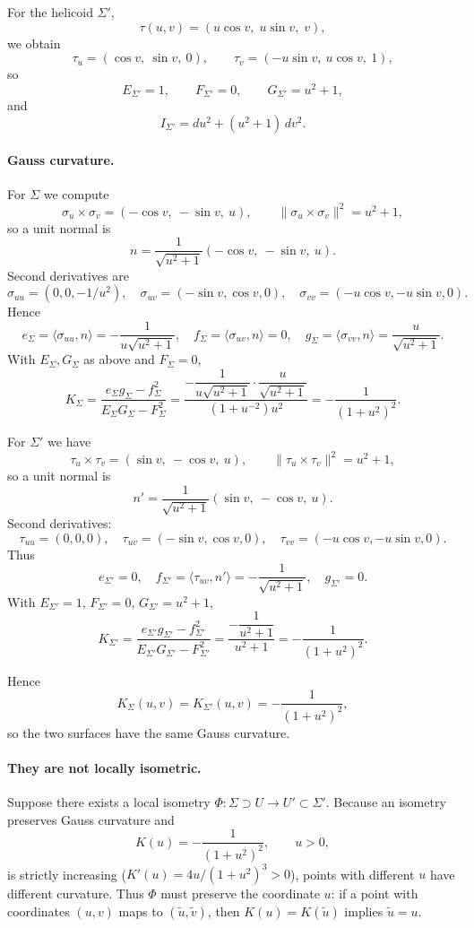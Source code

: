 \documentclass[12pt,a4paper]{article}
\theoremstyle{plain}
\theoremstyle{definition}      %
\begin{document}
	For the helicoid $\Sigma'$,
	\[
	\tau(u,v) = (u\cos v,\;u\sin v,\;v),
	\]
	we obtain
	\[
	\tau_u=(\cos v,\ \sin v,\ 0),\qquad
	\tau_v=(-u\sin v,\ u\cos v,\ 1),
	\]
	so
	\[
	E_{\Sigma'} = 1,\qquad
	F_{\Sigma'} = 0,\qquad
	G_{\Sigma'} = u^2+1,
	\]
	and
	\[
	I_{\Sigma'} = du^2 + (u^2+1)\,dv^2.
	\]
	
	\paragraph{Gauss curvature.}
	
	For $\Sigma$ we compute
	\[
	\sigma_u\times\sigma_v = (-\cos v,\ -\sin v,\ u),
	\qquad
	\| \sigma_u\times\sigma_v \|^2 = u^2+1,
	\]
	so a unit normal is
	\[
	n = \frac{1}{\sqrt{u^2+1}}(-\cos v,\ -\sin v,\ u).
	\]
	Second derivatives are
	\[
	\sigma_{uu}=(0,0,-1/u^2),\quad
	\sigma_{uv}=(-\sin v,\cos v,0),\quad
	\sigma_{vv}=(-u\cos v,-u\sin v,0).
	\]
	Hence
	\[
	e_\Sigma = \langle\sigma_{uu},n\rangle
	= -\frac{1}{u\sqrt{u^2+1}},\quad
	f_\Sigma = \langle\sigma_{uv},n\rangle = 0,\quad
	g_\Sigma = \langle\sigma_{vv},n\rangle
	= \frac{u}{\sqrt{u^2+1}}.
	\]
	With $E_\Sigma,G_\Sigma$ as above and $F_\Sigma=0$,
	\[
	K_\Sigma
	= \frac{e_\Sigma g_\Sigma - f_\Sigma^{2}}{E_\Sigma G_\Sigma-F_\Sigma^{2}}
	= \frac{-\dfrac{1}{u\sqrt{u^2+1}}\cdot
		\dfrac{u}{\sqrt{u^2+1}}}{(1+u^{-2})u^2}
	= -\frac{1}{(1+u^2)^2}.
	\]
	
	For $\Sigma'$ we have
	\[
	\tau_u\times\tau_v = (\sin v,\ -\cos v,\ u),\qquad
	\|\tau_u\times\tau_v\|^2 = u^2+1,
	\]
	so a unit normal is
	\[
	n' = \frac{1}{\sqrt{u^2+1}}(\sin v,\ -\cos v,\ u).
	\]
	Second derivatives:
	\[
	\tau_{uu}=(0,0,0),\quad
	\tau_{uv}=(-\sin v,\cos v,0),\quad
	\tau_{vv}=(-u\cos v,-u\sin v,0).
	\]
	Thus
	\[
	e_{\Sigma'} = 0,\quad
	f_{\Sigma'} = \langle\tau_{uv},n'\rangle
	= -\frac{1}{\sqrt{u^2+1}},\quad
	g_{\Sigma'} = 0.
	\]
	With $E_{\Sigma'}=1$, $F_{\Sigma'}=0$, $G_{\Sigma'}=u^2+1$,
	\[
	K_{\Sigma'}
	= \frac{e_{\Sigma'}g_{\Sigma'}-f_{\Sigma'}^{2}}
	{E_{\Sigma'}G_{\Sigma'}-F_{\Sigma'}^{2}}
	= \frac{-\dfrac{1}{u^2+1}}{u^2+1}
	= -\frac{1}{(1+u^2)^2}.
	\]
	
	Hence
	\[
	K_\Sigma(u,v) = K_{\Sigma'}(u,v)
	= -\frac{1}{(1+u^2)^2},
	\]
	so the two surfaces have the same Gauss curvature.
	
	\paragraph{They are not locally isometric.}
	
	Suppose there exists a local isometry
	\(\Phi:\Sigma\supset U\to U'\subset\Sigma'\).
	Because an isometry preserves Gauss curvature and
	\[
	K(u) = -\frac{1}{(1+u^2)^2},
	\qquad u>0,
	\]
	is strictly increasing
	($K'(u)=4u/(1+u^2)^3>0$), points with different $u$ have different curvature.
	Thus $\Phi$ must preserve the coordinate $u$: if a point
	with coordinates $(u,v)$ maps to $(\tilde u,\tilde v)$, then
	$K(u)=K(\tilde u)$ implies $\tilde u=u$.
	
\end{document}
